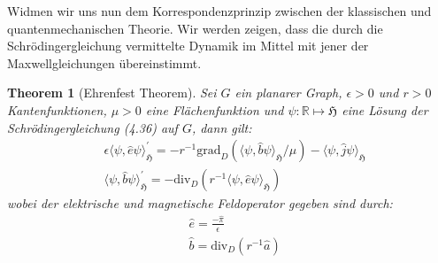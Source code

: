 \documentclass[11pt,a4paper,leqno]{report}
\newtheorem{theorem}{Theorem}[chapter]
\numberwithin{equation}{chapter}
\begin{document}
\noindent
Widmen wir uns nun dem Korrespondenzprinzip zwischen der klassischen und quantenmechanischen Theorie.
Wir werden zeigen, dass die durch die Schr\"odingergleichung vermittelte Dynamik im Mittel mit jener der Maxwellgleichungen \"ubereinstimmt. 
\begin{theorem}[Ehrenfest Theorem]
	Sei $G$ ein planarer Graph, $\epsilon>0$ und $r>0$ Kantenfunktionen, $\mu>0$ eine Fl\"achenfunktion und $\psi: \mathbb{R}\mapsto \mathfrak{H}$ eine L\"osung der Schr\"odingergleichung (4.36) auf $G$, dann gilt:
	\begin{align}
		&\epsilon\langle \psi, \hat{e}\psi\rangle_{\mathfrak{H}}^\prime =  -r^{-1} \text{grad}_D(\langle\psi,\hat{b}\psi\rangle_{\mathfrak{H}}/\mu) -  \langle \psi, \hat{j} \psi\rangle_{\mathfrak{H}}\\
		&\langle \psi, \hat{b}\psi\rangle_{\mathfrak{H}}^\prime = -\text{div}_D(r^{-1}\langle\psi, \hat{e}\psi\rangle_{\mathfrak{H}})
	\end{align}
	wobei der elektrische und magnetische Feldoperator gegeben sind durch:
	\begin{align}
		&\hat{e} = \frac{-\hat{\pi}}{\epsilon}\\
		&\hat{b} = \text{div}_D(r^{-1}\hat{a})
	\end{align}
\end{theorem}
\end{document}
